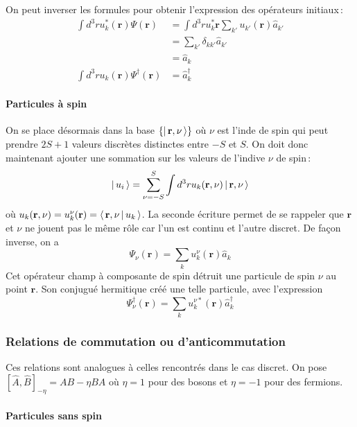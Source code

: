             On peut inverser les formules pour obtenir l’expression des opérateurs initiaux :
            \begin{align*}
                \int d^3 r u_k^*(\mathbf{r}) \Psi(\mathbf{r}) 
                &= \int d^3 r u_k^*\mathbf{r} \sum_{k'} u_{k'}(\mathbf{r}) \hat{a}_{k'} \\
                &= \sum_{k'} \delta_{kk'} \hat{a}_{k'} \\
                &= \hat{a}_{k} \\
                \int d^3 r u_k(\mathbf{r}) \Psi^{\dagger}(\mathbf{r}) 
                &= \hat{a}_k^{\dagger}
            \end{align*}

            \paragraph{Particules à spin}

            On se place désormais dans la base $\left\{\left| \, \mathbf{r}, \nu \, \right>\right\}$ où $\nu$ est l’inde de spin qui peut prendre $2 S + 1$ valeurs discrètes distinctes entre $-S$ et $S$. On doit donc maintenant ajouter une sommation sur les valeurs de l’indive $\nu$ de spin :
            \[ \left| \, u_i \, \right> = \sum_{\nu = -S}^S \int d^3r u_k(\mathbf{r}, \nu) \left| \, \mathbf{r}, \nu \, \right> \]
            où $u_k(\mathbf{r}, \nu) = u_k^{\nu}(\mathbf{r}) = \left< \, \mathbf{r}, \nu \, \middle| \, u_k \, \right>$. La seconde écriture permet de se rappeler que $\mathbf{r}$ et $\nu$ ne jouent pas le même rôle car l’un est continu et l’autre discret. De façon inverse, on a 
            \[ \Psi_{\nu}(\mathbf{r}) = \sum_{k} u_k^{\nu}(\mathbf{r}) \hat{a}_{k} \]   
            Cet opérateur champ à composante de spin détruit une particule de spin $\nu$ au point $\mathbf{r}$. Son conjugué hermitique créé une telle particule, avec l’expression 
            \[ \Psi_{\nu}^{\dagger}(\mathbf{r}) = \sum_{k} u_k^{\nu *}(\mathbf{r}) \hat{a}^{\dagger}_{k} \]

        \subsubsection{Relations de commutation ou d’anticommutation}

        Ces relations sont analogues à celles rencontrés dans le cas discret. On pose $\left[\hat{A}, \hat{B}\right]_{-\eta} = AB - \eta BA$ où $\eta = 1$ pour des bosons et $\eta = -1$ pour des fermions.

            \paragraph{Particules sans spin}


